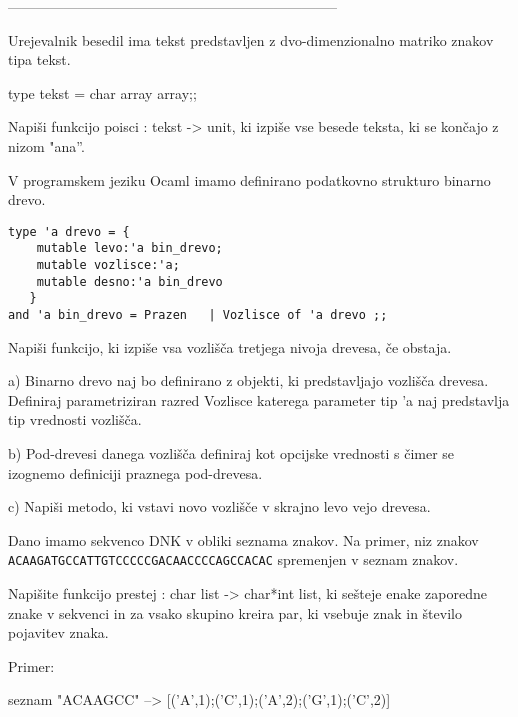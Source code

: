 -----------------------------------------------------------------------


\begin{ex}
  Urejevalnik besedil ima tekst predstavljen z dvo-dimenzionalno
  matriko znakov tipa tekst.

  type tekst = char array array;;

  Napi\v si funkcijo poisci : tekst -> unit, ki izpi\v se vse besede
  teksta, ki se kon\v cajo z nizom "ana''.


\end{ex} 
\begin{ex} 
  V programskem jeziku Ocaml imamo definirano podatkovno strukturo
  binarno drevo.

\begin{verbatim}
type 'a drevo = { 
    mutable levo:'a bin_drevo; 
    mutable vozlisce:'a; 
    mutable desno:'a bin_drevo 
   } 
and 'a bin_drevo = Prazen 	| Vozlisce of 'a drevo ;;

\end{verbatim}
  Napi\v si funkcijo, ki izpi\v se vsa vozli\v s\v ca tretjega nivoja
  drevesa, \v ce obstaja.


\end{ex} 
\begin{ex}
  a) Binarno drevo naj bo definirano z objekti, ki predstavljajo
  vozli\v s\v ca drevesa. Definiraj parametriziran razred Vozlisce
  katerega parameter tip 'a naj predstavlja tip vrednosti vozli\v s\v
  ca.

  b) Pod-drevesi danega vozli\v s\v ca definiraj kot opcijske
  vrednosti s \v cimer se izognemo definiciji praznega pod-drevesa.

  c) Napi\v si metodo, ki vstavi novo vozli\v s\v ce v skrajno levo
  vejo drevesa.



\end{ex} 
\begin{ex}
  Dano imamo sekvenco DNK v obliki seznama znakov.  Na primer, niz
  znakov \texttt{ACAAGATGCCATTGTCCCCCGACAACCCCAGCCACAC} spremenjen v
  seznam znakov.

  Napi\v site funkcijo prestej : char list -> char*int list, ki se\v
  steje enake zaporedne znake v sekvenci in za vsako skupino kreira
  par, ki vsebuje znak in \v stevilo pojavitev znaka.

  Primer:

  seznam "ACAAGCC" --> [('A',1);('C',1);('A',2);('G',1);('C',2)]


\end{ex} 
